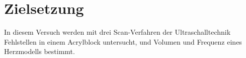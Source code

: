 \section{Zielsetzung}
\label{sec:Zielsetzung}
In diesem Versuch werden mit drei Scan-Verfahren der Ultraschalltechnik Fehlstellen in einem Acrylblock untersucht, und Volumen und Frequenz eines Herzmodells bestimmt.


